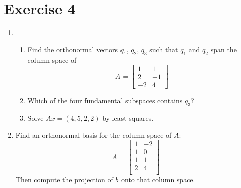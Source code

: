 \section{Exercise 4}
\begin{enumerate}[label=(\alph*)]
    \item 
        \begin{enumerate}[label=(\arabic*)]
            \item Find the orthonormal vectors $q_{1}$, $ q_{2}$, $q_{3}$ such that
                $q_{1}$ and $q_{2}$ span the column space of 
                \begin{equation}
                    A = 
                    \begin{bmatrix}
                        1       &       1       \\
                        2       &       -1      \\
                        -2      &       4
                    \end{bmatrix}
                \end{equation}

            \item Which of the four fundamental subspaces contains $q_{3}$?

            \item Solve $Ax = (4,5,2,2)$ by least squares.
        \end{enumerate}

    \item Find an orthonormal basis for the column space of $A$:
        \begin{equation}
            A = 
            \begin{bmatrix}
                1       &       -2      \\
                1       &       0       \\
                1       &       1       \\
                2       &       4       \\
            \end{bmatrix}
        \end{equation}
        Then compute the projection of $b$ onto that column space.


\end{enumerate}
